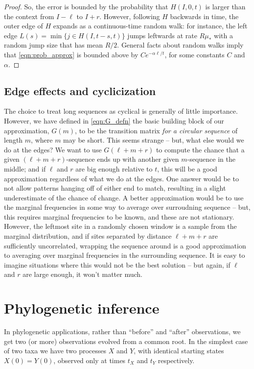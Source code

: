 \documentclass{article}
\theoremstyle{plain}
\theoremstyle{definition}
\begin{document}
\begin{proof}
So, the error is bounded by the probability that $H(I,0,t)$ is larger than the context from $I-\ell$ to $I+r$.
However, following $H$ backwards in time, the outer edge of $H$ expands as a continuous-time random walk:
for instance, the left edge $L(s) = \min \{ j \in H(I,t-s,t) \}$ jumps leftwards at rate $R\mu_*$ with a random jump size
that has mean $R/2$.
General facts about random walks imply that \eqref{eqn:prob_approx} is bounded above by $C e^{-\alpha \ell/t}$, for some constants $C$ and $\alpha$.

\end{proof}

\subsection{Edge effects and cyclicization}

The choice to treat long sequences as cyclical is generally of little importance.
However, we have defined in \eqref{eqn:G_defn} the basic building block of our approximation, $G(m)$,
to be the transition matrix \emph{for a circular sequence} of length $m$, where $m$ may be short.
This seems strange -- but, what else would we do at the edges?
We want to use $G(\ell+m+r)$ to compute the chance that a given $(\ell+m+r)$-sequence ends up with another given $m$-sequence in the middle;
and if $\ell$ and $r$ are big enough relative to $t$, this will be a good approximation regardless of what we do at the edges.
One answer would be to not allow patterns hanging off of either end to match,
resulting in a slight underestimate of the chance of change.
A better approximation would be to use the marginal frequencies in some way to average over surroudning sequence 
-- but, this requires marginal frequencies to be known, and these are not stationary.
However, the leftmost site in a randomly chosen window is a sample from the marginal distribution,
and if sites separated by distance $\ell+m+r$ are sufficiently uncorrelated,
wrapping the sequence around is a good approximation to averaging over marginal frequencies in the surrounding sequence.
It is easy to imagine situations where this would not be the best solution --
but again, if $\ell$ and $r$ are large enough, it won't matter much.

\section{Phylogenetic inference}

In phylogenetic applications, rather than ``before'' and ``after'' observations,
we get two (or more) observations evolved from a common root.
In the simplest case of two taxa we have two processes $X$ and $Y$,
with identical starting states $X(0)=Y(0)$,
observed only at times $t_X$ and $t_Y$ respectively.
\end{document}
